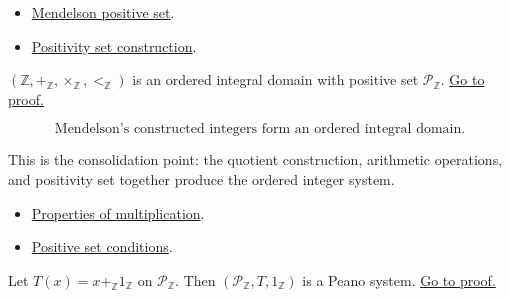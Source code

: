 \begin{dependencies}
\begin{itemize}
  \item \hyperref[def:men-positive-set]{Mendelson positive set}.
  \item \hyperref[thm:men-pos-set]{Positivity set construction}.
\end{itemize}
\end{dependencies}

\begin{corollary}[Mendelson 4.6]
\label{cor:men-integers-ordered-integral-domain}
\((\mathbb{Z},+_{\mathbb{Z}},\times_{\mathbb{Z}},<_{\mathbb{Z}})\) is an
ordered integral domain with positive set \(\mathcal{P}_{\mathbb{Z}}\).
\hyperref[prf:men-integers-ordered-integral-domain]{Go to proof.}
\end{corollary}

\begin{remark*}
\[
  \text{Mendelson's constructed integers form an ordered integral domain.}
\]
\end{remark*}

\begin{remark*}[Interpretation]
This is the consolidation point: the quotient construction, arithmetic
operations, and positivity set together produce the ordered integer system.
\end{remark*}

\begin{dependencies}
\begin{itemize}
  \item \hyperref[thm:men-mul]{Properties of multiplication}.
  \item \hyperref[lem:men-positive-set-conditions]{Positive set conditions}.
\end{itemize}
\end{dependencies}

\begin{theorem}
\label{thm:men-positive-integers-form-peano-system}
Let \(T(x)=x+_{\mathbb{Z}}1_{\mathbb{Z}}\) on
\(\mathcal{P}_{\mathbb{Z}}\). Then
\((\mathcal{P}_{\mathbb{Z}},T,1_{\mathbb{Z}})\) is a Peano system.
\hyperref[prf:men-positive-integers-form-peano-system]{Go to proof.}
\end{theorem}

